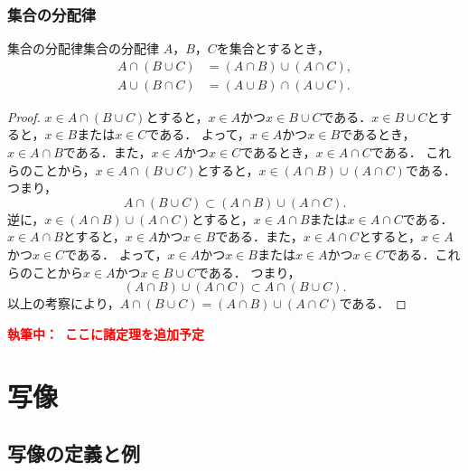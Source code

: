 \documentclass[a4paper,11pt]{ltjsarticle}
\newenvironment{tleftbar}{\begin{tbleftline}\setlength{\parindent}{1\zw}}{\end{tbleftline}}
\newcommand{\draftnote}[1]{\begin{center}\textbf{\textcolor{red}{執筆中：~#1}}\end{center}}
\begin{document}
        \subsubsection{集合の分配律}

        \begin{prop}{集合の分配律}{集合の分配律}
          $A$，$B$，$C$を集合とするとき，
          \begin{align*} 
            A \cap ( B \cup C) &= (A \cap B) \cup (A \cap C), \\
            A \cup ( B \cap C) &= (A \cup B) \cap (A \cup C).
          \end{align*}
        \end{prop}
        
        \begin{tleftbar}
        \begin{proof}
        $ x \in A \cap ( B \cup C)$とすると，$x \in A$かつ$x \in B \cup C$である．$x \in B \cup C$とすると，$x \in B$または$x \in C$である．
        よって，$x \in A$かつ$x \in B$であるとき，$x \in A \cap B$である．また，$x \in A$かつ$x \in C$であるとき，$x \in A \cap C$である．
        これらのことから，$x \in A \cap ( B \cup C)$とすると，$x \in (A \cap B) \cup (A \cap C)$である．
        つまり，
        \[
        A \cap ( B \cup C) \subset (A \cap B) \cup (A \cap C).
        \]
        逆に，$x \in (A \cap B) \cup (A \cap C)$とすると，$x \in A \cap B$または$x \in A \cap C$である．
        $x \in A \cap B$とすると，$x \in A$かつ$x \in B$である．また，$x \in A \cap C$とすると，$x \in A$かつ$x \in C$である．
        よって，$x \in A$かつ$x \in B$または$x \in A$かつ$x \in C$である．これらのことから$x \in A$かつ$x \in B \cup C$である．
        つまり，
        \[
        (A \cap B) \cup (A \cap C) \subset A \cap ( B \cup C).
        \]
        以上の考察により，$A \cap ( B \cup C) = (A \cap B) \cup (A \cap C)$である．
      \end{proof}
      \end{tleftbar}
        
      \draftnote{ここに諸定理を追加予定}

      \newpage 
        \section{写像}

        \subsection{写像の定義と例}
\end{document}
